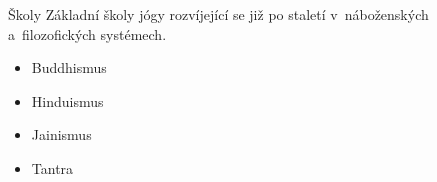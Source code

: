 \documentclass[pdf,slideColor,fyma]{beamer}
\begin{document}
\begin{frame}{Školy}
	Základní školy jógy rozvíjející se již po staletí v~náboženských a~filozofických systémech.
	\medskip
	\begin{figure}
	\begin{figure}
  		\begin{center}
  		\end{center}
	\end{figure}
	\end{figure}
	\begin{itemize}
		\item Buddhismus
		\item Hinduismus
		\item Jainismus
		\item Tantra
	\end{itemize}
\end{frame}
\end{document}
